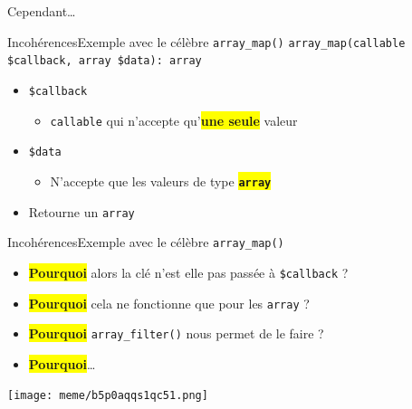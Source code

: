 \begin{frameC}{Cependant\ldots}

\end{frameC}

\begin{frame}{Incohérences}{Exemple avec le célèbre \texttt{array\_map()}}
    \texttt{array\_map(callable \$callback, array \$data): array}

    \pause

    \begin{itemize}[<+->]
        \item \texttt{\$callback}

        \begin{itemize}[<+->]
            \item \texttt{callable} qui n'accepte qu'\colorbox{yellow}{\textbf{une seule}} valeur
        \end{itemize}

        \item \texttt{\$data}

        \begin{itemize}[<+->]
            \item N'accepte que les valeurs de type \colorbox{yellow}{\texttt{\textbf{array}}}
        \end{itemize}

        \item Retourne un \texttt{array}
    \end{itemize}

\end{frame}

\begin{frame}{Incohérences}{Exemple avec le célèbre \texttt{array\_map()}}
    \begin{itemize}[<+->]
        \item \colorbox{yellow}{\textbf{Pourquoi}} alors la clé n'est elle pas passée à \texttt{\$callback} ?
        \item \colorbox{yellow}{\textbf{Pourquoi}} cela ne fonctionne que pour les \texttt{array} ?
        \item \colorbox{yellow}{\textbf{Pourquoi}} \texttt{array\_filter()} nous permet de le faire ?
        \item \colorbox{yellow}{\textbf{Pourquoi}}\ldots
    \end{itemize}
\end{frame}

\begin{frame}
    \begin{center}
        \texttt{[image: meme/b5p0aqqs1qc51.png]}
    \end{center}
\end{frame}

